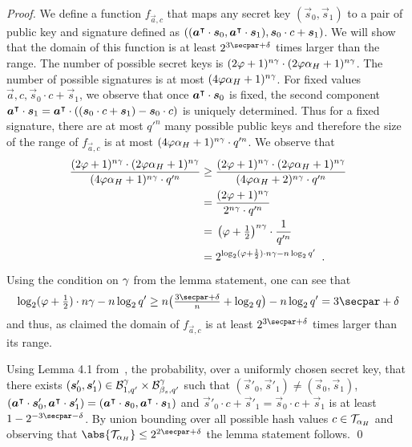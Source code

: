 \begin{proof}
  We define a function $f_{\vec{a}, c}$ that maps any secret key $(\vec{s}_0, \vec{s}_1)$ to a pair of public key and signature defined as $((\boldsymbol{a}^\intercal\cdot\boldsymbol{s}_0,\boldsymbol{a}^\intercal\cdot\boldsymbol{s}_1), \boldsymbol{s}_0\cdot c + \boldsymbol{s}_1)$.
  We will show that the domain of this function is at least $2^{3\secpar + \delta}$ times larger than the range.
  The number of possible secret keys is $(2\varphi+1)^{n\gamma} \cdot (2\varphi\alpha_H+1)^{n\gamma}$.
  The number of possible signatures is at most $(4\varphi\alpha_H + 1)^{n\gamma}$.
  For fixed values $\vec{a}, c, \vec{s}_0\cdot c + \vec{s}_1$, we observe that once $\boldsymbol{a}^\intercal\cdot\boldsymbol{s}_0$ is fixed, the second component $\boldsymbol{a}^\intercal\cdot\boldsymbol{s}_1 = \boldsymbol{a}^\intercal \cdot ((\boldsymbol{s}_0\cdot c + \boldsymbol{s}_1) - \boldsymbol{s}_0 \cdot c)$ is uniquely determined.
  Thus for a fixed signature, there are at most $q'^n$ many possible public keys and therefore the size of the range of $f_{\vec{a}, c}$ is at most $(4 \varphi\alpha_H + 1)^{n\gamma} \cdot q'^n$.
  We observe that
  \begin{align*}\frac{(2\varphi+1)^{n\gamma} \cdot (2\varphi\alpha_H+1)^{n\gamma}}{(4 \varphi\alpha_H + 1)^{n\gamma} \cdot q'^n}
   \geq{}& \frac{(2\varphi+1)^{n\gamma} \cdot (2\varphi\alpha_H+1)^{n\gamma}}{(4 \varphi\alpha_H + 2)^{n\gamma} \cdot q'^n}\\
   ={}& \frac{(2\varphi+1)^{n\gamma}}{2^{n\gamma} \cdot q'^n}\\
   ={}& \left(\varphi+\tfrac{1}{2}\right)^{n\gamma} \cdot \frac{1}{q'^n}\\
   ={}& 2^{\log_2(\varphi+\frac{1}{2})\cdot{n\gamma} - n \log_2 q'}\enspace.
  \end{align*}
  Using the condition on $\gamma$ from the lemma statement, one can see that
  \[
    \log_2(\varphi+\tfrac{1}{2})\cdot{n\otspkkeylen} - n \log_2 q'
    \geq n\bigl(\tfrac{3\secpar+\delta}{n}+\log_2q\bigr) - n \log_2 q' = 3\secpar+\delta
  \]
  and thus, as claimed the domain of $f_{\vec{a},c}$ is at least $2^{3\secpar + \delta}$ times larger than its range.
  
  Using Lemma 4.1 from~\cite{TCC:LyuMic08}, the probability, over a uniformly chosen secret key, that there exists $(\boldsymbol{s}'_0,\boldsymbol{s}'_1)\in \mathcal{B}_{1, q'}^\gamma \times \mathcal{B}_{\beta_s, q'}^\gamma$ such that $(\vec{s}'_0,\vec{s}'_1)\neq(\vec{s}_0,\vec{s}_1)$, $(\boldsymbol{a}^\intercal\cdot\boldsymbol{s}'_0,\boldsymbol{a}^\intercal\cdot\boldsymbol{s}'_1) = (\boldsymbol{a}^\intercal\cdot\boldsymbol{s}_0,\boldsymbol{a}^\intercal\cdot\boldsymbol{s}_1)$ and $\vec{s}'_0\cdot c + \vec{s}'_1 = \vec{s}_0\cdot c + \vec{s}_1$ is at least $1-2^{-3\secpar-\delta}$.
  By union bounding over all possible hash values $c \in \mathcal{T}_{\alpha_H}$ and observing that $\abs{\tern_{\alpha_H}} \leq 2^{2\secpar + \delta}$ the lemma statement follows.
  \qed
\end{proof}

